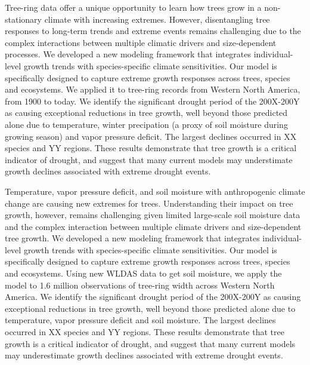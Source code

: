 \documentclass{article}
\begin{document}
Tree-ring data offer a unique opportunity to learn how trees grow in a non-stationary climate with increasing extremes. However, disentangling tree responses to long-term trends and extreme events remains challenging due to the complex interactions between multiple climatic drivers and size-dependent processes. We developed a new modeling framework that integrates individual-level growth trends with species-specific climate sensitivities. Our model is specifically designed to capture extreme growth responses across trees, species and ecosystems. We applied it to tree-ring records from Western North America, from 1900 to today. We identify the significant drought period of the 200X-200Y as causing exceptional reductions in tree growth, well beyond those predicted alone due to temperature, winter precipation (a proxy of soil moisture during growing season) and vapor pressure deficit. The largest declines occurred in XX species and YY regions. These results demonstrate that tree growth is a critical indicator of drought, and suggest that many current models may understimate growth declines associated with extreme drought events.

\vspace*{1cm}

Temperature, vapor pressure deficit, and soil moisture with anthropogenic climate change are causing new extremes for trees. Understanding their impact on tree growth, however, remains challenging given limited large-scale soil moisture data and the complex interaction between multiple climate drivers and size-dependent tree growth. We developed a new modeling framework that integrates individual-level growth trends with species-specific climate sensitivities. Our model is specifically designed to capture extreme growth responses across trees, species and ecosystems. Using new WLDAS data to get soil moisture, we apply the model to 1.6  million observations of tree-ring width across Western North America. We identify the significant drought period of the 200X-200Y as causing exceptional reductions in tree growth, well beyond those predicted alone due to temperature, vapor pressure deficit and soil moisture. The largest declines occurred in XX species and YY regions. These results demonstrate that tree growth is a critical indicator of drought, and suggest that many current models may underestimate growth declines associated with extreme drought events.
\end{document}

